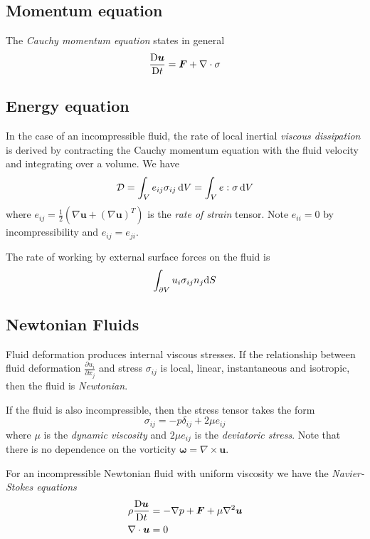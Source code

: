 \documentclass{jknotes}
\begin{document}
\subsection{Momentum equation}
The \emph{Cauchy momentum equation} states in general
\begin{equation}
	\frac{\mathrm{D}{\bm{u}}}{\mathrm{D}{t}} = \bm{F} + \nabla \cdot \sigma
\end{equation}

\subsection{Energy equation}
In the case of an incompressible fluid, the rate of local inertial
\emph{viscous dissipation} is derived by contracting the Cauchy momentum
equation with the fluid velocity and integrating over a volume. We have
\begin{equation}
	\mathcal{D} = \int_V e_{ij} \sigma_{ij} \,\diffd{V} = \int_V e:\sigma \,
	\diffd{V}
\end{equation}
where $e_{ij} = \frac{1}{2}\left(\nabla \bm{u} + \left(\nabla
\bm{u}\right)^T\right)$ is the \emph{rate of strain} tensor. Note $e_{ii} = 0$
by incompressibility and $e_{ij} = e_{ji}$. 

The rate of working by external surface forces on the fluid is
\begin{equation}
	\int_{\partial V} u_i \sigma_{ij} n_j \diffd{S}
\end{equation}

\subsection{Newtonian Fluids}
\begin{defn}
Fluid deformation produces internal viscous stresses. If the relationship
between fluid deformation $\frac{\partial u_i}{\partial x_j}$ and stress
$\sigma_{ij}$ is local, linear, instantaneous and isotropic, then the fluid is
\emph{Newtonian}.
\end{defn}

If the fluid is also incompressible, then the stress tensor takes the form
\begin{equation}
	\sigma_{ij} = -p \delta_{ij} + 2\mu e_{ij}
\end{equation}
where $\mu$ is the \emph{dynamic viscosity} and $2 \mu e_{ij}$ is the
\emph{deviatoric stress}. Note that there is no dependence on the vorticity
$\bm{\omega} = \nabla \times \bm{u}$.

For an incompressible Newtonian fluid with uniform viscosity we have the
\emph{Navier-Stokes equations}
\begin{equation}
	\begin{aligned}
		\rho \frac{\mathrm{D}{\bm{u}}}{\mathrm{D}{t}} &= - \nabla p + \bm{F} + \mu
			\nabla^2 \bm{u} \\
			\nabla \cdot \bm{u} &=0
	\end{aligned}
\end{equation}
\end{document}
